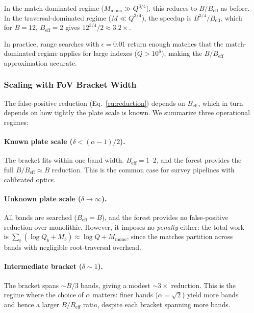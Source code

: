 \documentclass[twocolumn, 10pt]{article}
\begin{document}
In the match-dominated regime ($M_{\text{mono}} \gg Q^{3/4}$), this
reduces to $B / B_{\text{eff}}$ as before. In the traversal-dominated
regime ($M \ll Q^{3/4}$), the speedup is
$B^{3/4} / B_{\text{eff}}$, which for $B = 12$, $B_{\text{eff}} = 2$
gives $12^{3/4}/2 \approx 3.2\times$.

In practice, range searches with $\epsilon = 0.01$ return enough
matches that the match-dominated regime applies for large indexes
($Q > 10^6$), making the $B / B_{\text{eff}}$ approximation accurate.

\subsubsection{Scaling with FoV Bracket Width} \label{sec:fov_scaling}

The false-positive reduction (Eq.~\ref{eq:reduction}) depends on
$B_{\text{eff}}$, which in turn depends on how tightly the plate scale
is known. We summarize three operational regimes:

\paragraph{Known plate scale ($\delta < (\alpha - 1)/2$).}
The bracket fits within one band width. $B_{\text{eff}} = 1$--2, and
the forest provides the full $B / B_{\text{eff}} \approx B$ reduction.
This is the common case for survey pipelines with calibrated optics.

\paragraph{Unknown plate scale ($\delta \to \infty$).}
All bands are searched ($B_{\text{eff}} = B$), and the forest provides
no false-positive reduction over monolithic. However, it imposes no
\emph{penalty} either: the total work is $\sum_b (\log Q_b + M_b)
\approx \log Q + M_{\text{mono}}$, since the matches partition across
bands with negligible root-traversal overhead.

\paragraph{Intermediate bracket ($\delta \sim 1$).}
The bracket spans $\sim B/3$ bands, giving a modest $\sim 3\times$
reduction. This is the regime where the choice of $\alpha$ matters:
finer bands ($\alpha = \sqrt{2}$) yield more bands and hence a larger
$B/B_{\text{eff}}$ ratio, despite each bracket spanning more bands.
\end{document}
